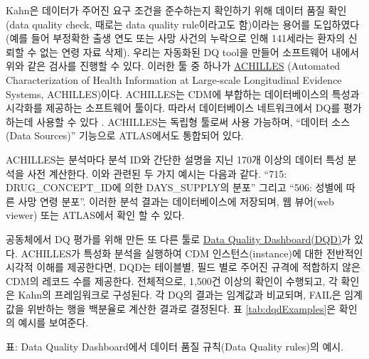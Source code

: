 \documentclass[11pt]{book}
\theoremstyle{definition}
\theoremstyle{definition}
\theoremstyle{definition}
\theoremstyle{remark}
\begin{document}
Kahn은 데이터가 주어진 요구 조건을 준수하는지 확인하기 위해 데이터 품질
확인 (data quality check, 때로는 data quality rule이라고도 함)이라는
용어를 도입하였다 (예를 들어 부정확한 출생 연도 또는 사망 사건의
누락으로 인해 141세라는 환자의 신뢰할 수 없는 연령 자료 삭제). 우리는
자동화된 DQ tool을 만들어 소프트웨어 내에서 위와 같은 검사를 진행할 수
있다. 이러한 툴 중 하나가
\href{https://github.com/OHDSI/Achilles}{ACHILLES} (Automated
Characterization of Health Information at Large-scale Longitudinal
Evidence Systems, ACHILLES)이다. \citep{huser_methods_2018} ACHILLES는
CDM에 부합하는 데이터베이스의 특성과 시각화를 제공하는 소프트웨어
툴이다. 따라서 데이터베이스 네트워크에서 DQ를 평가하는데 사용할 수 있다
\citep{huser_multisite_2016}. ACHILLES는 독립형 툴로써 사용 가능하며,
``데이터 소스(Data Sources)'' 기능으로 ATLAS에서도 통합되어 있다.
 

ACHILLES는 분석마다 분석 ID와 간단한 설명을 지닌 170개 이상의 데이터
특성 분석을 사전 계산한다. 이와 관련된 두 가지 예시는 다음과 같다.
``715: DRUG\_CONCEPT\_ID에 의한 DAYS\_SUPPLY의 분포'' 그리고 ``506:
성별에 따른 사망 연령 분포''. 이러한 분석 결과는 데이터베이스에
저장되며, 웹 뷰어(web viewer) 또는 ATLAS에서 확인 할 수 있다.


공동체에서 DQ 평가를 위해 만든 또 다른 툴로
\href{https://github.com/OHDSI/DataQualityDashboard}{Data Quality
Dashboard(DQD)}가 있다. ACHILLES가 특성화 분석을 실행하여 CDM
인스턴스(instance)에 대한 전반적인 시각적 이해를 제공한다면, DQD는
테이블별, 필드 별로 주어진 규격에 적합하지 않은 CDM의 레코드 수를
제공한다. 전체적으로, 1,500건 이상의 확인이 수행되고, 각 확인은 Kahn의
프레임워크로 구성된다. 각 DQ의 결과는 임계값과 비교되며, FAIL은 임계값을
위반하는 행을 백분율로 계산한 결과로 결정된다. 표
\ref{tab:dqdExamples}은 확인의 예시를 보여준다.

표: \label{tab:dqdExamples} Data Quality Dashboard에서 데이터 품질 규칙(Data
Quality rules)의 예시.
\end{document}
